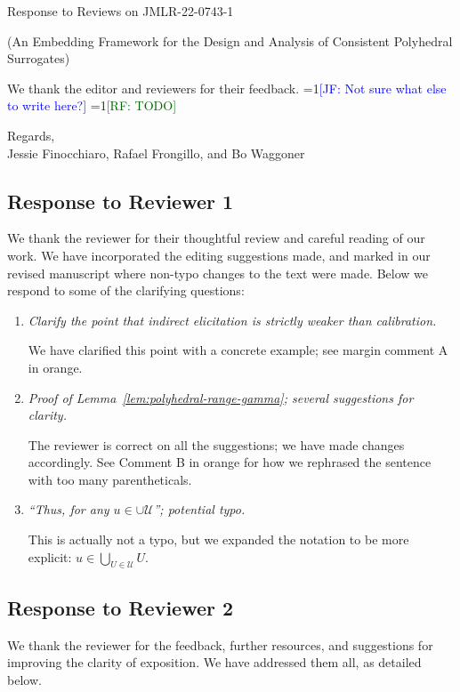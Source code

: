 \documentclass[a4paper]{article}
\newcommand{\Comments}{1}
\newcommand{\mynote}[2]{\ifnum\Comments=1\textcolor{#1}{#2}\fi}
\newcommand{\jessie}[1]{\mynote{blue}{[JF: #1]}}
\newcommand{\raf}[1]{\mynote{darkgreen}{[RF: #1]}}
\begin{document}
\begin{center}
  {\Large Response to Reviews on JMLR-22-0743-1}
  
  (An Embedding Framework for the Design and Analysis of Consistent Polyhedral Surrogates)
\end{center}


  We thank the editor and reviewers for their feedback.  
  \jessie{Not sure what else to write here?}
  \raf{TODO}

\bigskip
Regards,\\
Jessie Finocchiaro, Rafael Frongillo, and Bo Waggoner

\subsection*{Response to Reviewer 1}

We thank the reviewer for their thoughtful review and careful reading of our work. We have incorporated the editing suggestions made, and marked in our revised manuscript where non-typo changes to the text were made. 
Below we respond to some of the clarifying questions:
\begin{enumerate}
	\item \emph{Clarify the point that indirect elicitation is strictly weaker than calibration.}
	
	We have clarified this point with a concrete example; see margin comment A in orange.
	
	\item \emph{Proof of Lemma~\ref{lem:polyhedral-range-gamma}; several suggestions for clarity.}
		
	The reviewer is correct on all the suggestions; we have made changes accordingly.
	See Comment B in orange for how we rephrased the sentence with too many parentheticals.

	\item \emph{``Thus, for any $u \in \cup \mathcal{U}$''; potential typo.}
	
	This is actually not a typo, but we expanded the notation to be more explicit: $u \in \bigcup_{U \in \mathcal{U}} U$.
\end{enumerate}



\subsection*{Response to Reviewer 2}

We thank the reviewer for the feedback, further resources, and suggestions for improving the clarity of exposition.
We have addressed them all, as detailed below.
\end{document}
